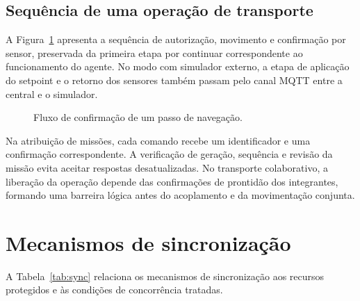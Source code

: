 \documentclass[12pt,a4paper]{article}
\begin{document}
\subsection{Sequência de uma operação de transporte}
A Figura~\ref{fig:sequencia} apresenta a sequência de autorização, movimento e
confirmação por sensor, preservada da primeira etapa por continuar
correspondente ao funcionamento do agente. No modo com simulador externo, a
etapa de aplicação do setpoint e o retorno dos sensores também passam pelo
canal MQTT entre a central e o simulador.

\begin{figure}[H]
    \centering
    \caption{Fluxo de confirmação de um passo de navegação.}
    \label{fig:sequencia}
\end{figure}

Na atribuição de missões, cada comando recebe um identificador e uma
confirmação correspondente. A verificação de geração, sequência e revisão da
missão evita aceitar respostas desatualizadas. No transporte colaborativo, a
liberação da operação depende das confirmações de prontidão dos integrantes,
formando uma barreira lógica antes do acoplamento e da movimentação conjunta.

\section{Mecanismos de sincronização}
\label{sec:sincronizacao}

A Tabela~\ref{tab:sync} relaciona os mecanismos de sincronização aos recursos
protegidos e às condições de concorrência tratadas.
\end{document}
